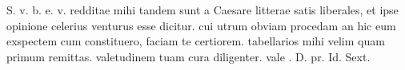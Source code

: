 


S. v. b. e. v. redditae mihi tandem sunt a Caesare litterae satis liberales, et ipse opinione celerius venturus esse dicitur. cui utrum obviam procedam an hic eum exspectem cum constituero, faciam te certiorem. tabellarios mihi velim quam primum remittas. valetudinem tuam cura diligenter. vale .  D. pr. Id. Sext.

